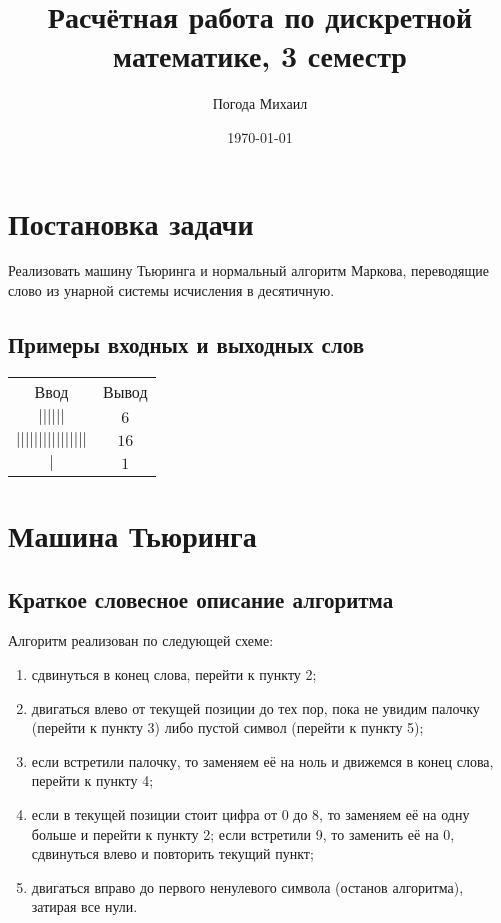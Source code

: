 \documentclass[titlepage,paper=a4,pagesize,draft]{scrartcl}
\author{Погода Михаил}
\title{Расчётная работа по дискретной математике, 3 семестр}
\date{\today}
\begin{document}
\maketitle
\tableofcontents
\section{Постановка задачи}
Реализовать машину Тьюринга и нормальный алгоритм Маркова, переводящие слово из унарной системы исчисления в десятичную.
\subsection{Примеры входных и выходных слов}
\begin{tabular}{cc}
Ввод & Вывод\\
$||||||$ & $6$\\
$||||||||||||||||$ & $16$\\
$|$ & $1$
\end{tabular}
\section{Машина Тьюринга}
\subsection{Краткое словесное описание алгоритма}
Алгоритм реализован по следующей схеме:
\begin{enumerate}
\item сдвинуться в конец слова, перейти к пункту 2;
\item двигаться влево от текущей позиции до тех пор, пока не увидим палочку (перейти к пункту 3) либо пустой символ (перейти к пункту 5);
\item если встретили палочку, то заменяем её на ноль и движемся в конец слова, перейти к пункту 4;
\item если в текущей позиции стоит цифра от 0 до 8, то заменяем её на одну больше и перейти к пункту 2; если встретили 9, то заменить её на 0, сдвинуться влево и повторить текущий пункт;
\item двигаться вправо до первого ненулевого символа (останов алгоритма), затирая все нули.
\end{enumerate}
\end{document}
